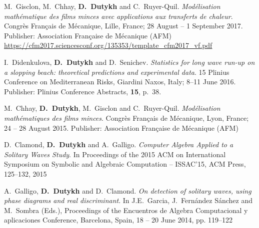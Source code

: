 \documentclass[final, a4paper, oneside, 12pt]{article}
\numberwithin{equation}{section}
\begin{document}
\begin{etaremune}
  \item M.~Gisclon, M.~Chhay, \textbf{D.~Dutykh} and C.~Ruyer-Quil. \textit{Mod\'elisation math\'ematique des films minces avec applications aux transferts de chaleur}. Congr\`es Fran\c{c}ais de M\'ecanique, Lille, France; 28 August -- 1 September 2017. Publisher: Association Fran\c{c}aise de M\'ecanique (AFM) \\ %
  \url{https://cfm2017.sciencesconf.org/135353/template_cfm2017_vf.pdf}
  

  
  \item I.~Didenkulova, \textbf{D.~Dutykh} and D.~Senichev. \textit{Statistics for long wave run-up on a slopping beach: theoretical predictions and experimental data}. 15 Plinius Conference on Mediterranean Risks, Giardini Naxos, Italy; 8--11 June 2016. Publisher: Plinius Conference Abstracts, \textbf{15}, p.~38. %

  

  
  \item M.~Chhay, \textbf{D.~Dutykh}, M.~Gisclon and C.~Ruyer-Quil. \textit{Mod\'elisation math\'ematiques des films minces}. Congr\`es Fran\c{c}ais de M\'ecanique, Lyon, France; 24 -- 28 August 2015. Publisher: Association Fran\c{c}aise de M\'ecanique (AFM) \\ %
  
  \item D.~Clamond, \textbf{D.~Dutykh} and A.~Galligo. \textit{Computer Algebra Applied to a Solitary Waves Study}. In Proceedings of the 2015 ACM on International Symposium on Symbolic and Algebraic Computation -- ISSAC'15, ACM Press, 125--132, 2015 %
  

  
  \item A.~Galligo, \textbf{D.~Dutykh} and D.~Clamond. \textit{On detection of solitary waves, using phase diagrams and real discriminant}. In J.E.~Garcia, J.~Fern\'andez S\'anchez and M.~Sombra (Eds.), Proceedings of the Encuentros de Algebra Computacional y aplicaciones Conference, Barcelona, Spain, 18 -- 20 June 2014, pp. 119--122 %
  

\end{etaremune}
\end{document}
